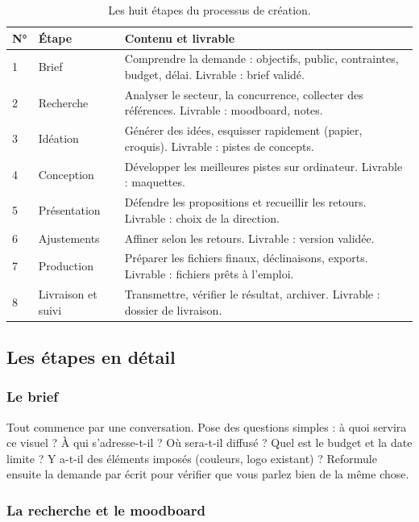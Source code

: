 \begin{table}[h!]
\centering
\begin{tabular}{@{}p{0.9cm}p{3.3cm}p{9.8cm}@{}}
\toprule
\textbf{N°} & \textbf{Étape} & \textbf{Contenu et livrable} \\
\midrule
1 & Brief & Comprendre la demande : objectifs, public, contraintes, budget, délai. Livrable : brief validé. \\
2 & Recherche & Analyser le secteur, la concurrence, collecter des références. Livrable : moodboard, notes. \\
3 & Idéation & Générer des idées, esquisser rapidement (papier, croquis). Livrable : pistes de concepts. \\
4 & Conception & Développer les meilleures pistes sur ordinateur. Livrable : maquettes. \\
5 & Présentation & Défendre les propositions et recueillir les retours. Livrable : choix de la direction. \\
6 & Ajustements & Affiner selon les retours. Livrable : version validée. \\
7 & Production & Préparer les fichiers finaux, déclinaisons, exports. Livrable : fichiers prêts à l'emploi. \\
8 & Livraison et suivi & Transmettre, vérifier le résultat, archiver. Livrable : dossier de livraison. \\
\bottomrule
\end{tabular}
\caption{Les huit étapes du processus de création.}
\end{table}

\subsection{Les étapes en détail}

\subsubsection{Le brief}

Tout commence par une conversation. Pose des questions simples : à quoi servira ce visuel ? À qui s'adresse-t-il ? Où sera-t-il diffusé ? Quel est le budget et la date limite ? Y a-t-il des éléments imposés (couleurs, logo existant) ? Reformule ensuite la demande par écrit pour vérifier que vous parlez bien de la même chose.

\subsubsection{La recherche et le moodboard}

